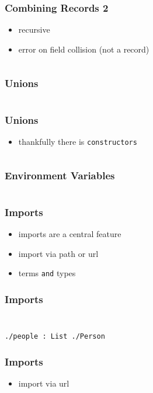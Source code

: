 \documentclass{beamer}
\begin{document}
\begin{frame}[fragile]
  \frametitle{Combining Records 2}
  \begin{itemize}
  \item recursive
  \item error on field collision (not a record)
  \end{itemize}
  \inputminted{text}{static-source/records-combine2.out}
\end{frame}

\begin{frame}
  \frametitle{Unions}
  \inputminted{text}{static-source/unions.out}
\end{frame}

 \begin{frame}
  \frametitle{Unions}
  \begin{itemize}
  \item thankfully there is \texttt{constructors}
  \end{itemize}
  \inputminted{text}{dhall/constructors.dhall}
\end{frame}

\begin{frame}[fragile]
  \frametitle{Environment Variables}
  \inputminted{text}{dhall/env.dhall}
\end{frame}

\begin{frame}
  \frametitle{Imports}
  \begin{itemize}
  \item imports are a central feature
  \item import via path or url
  \item terms \texttt{and} types
  \end{itemize}
\end{frame}

\begin{frame}[fragile]
  \frametitle{Imports}
  \inputminted{text}{dhall/persons/people}
  \inputminted{text}{dhall/persons/Person}
  \begin{verbatim}
./people : List ./Person
  \end{verbatim}
\end{frame}

\begin{frame}
  \frametitle{Imports}
  \begin{itemize}
  \item import via url
  \end{itemize}
  \vfill
  \inputminted{text}{dhall/persons/UrlImport.dhall}
\end{frame}
\end{document}
